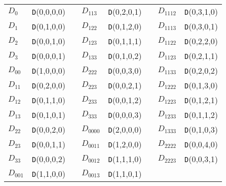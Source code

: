 \documentclass[preprint,sort&compress,12pt]{elsarticle}
\def\arraystretch{1.2}
\begin{document}
\begin{table}
\begin{center}
\renewcommand{\arraystretch}{1.2}
    \begin{tabular}{l|lcl|lcl|l}
$D_0$  & {\tt D}(0,0,0,0)   &\phantom{space}& $D_{113}$ & {\tt D}(0,2,0,1) &\phantom{space}& 
                               $D_{1112}$ & {\tt D}(0,3,1,0) \\  
$D_1$  & {\tt D}(0,1,0,0)   &\phantom{space}& $D_{122}$ & {\tt D}(0,1,2,0) &\phantom{space}& 
                               $D_{1113}$ & {\tt D}(0,3,0,1) \\  
$D_2$  & {\tt D}(0,0,1,0)   &\phantom{space}& $D_{123}$ & {\tt D}(0,1,1,1) &\phantom{space}& 
                               $D_{1122}$ & {\tt D}(0,2,2,0) \\ 
$D_3$  & {\tt D}(0,0,0,1)   &\phantom{space}& $D_{133}$ & {\tt D}(0,1,0,2) &\phantom{space}& 
                               $D_{1123}$ & {\tt D}(0,2,1,1) \\  
$D_{00}$  & {\tt D}(1,0,0,0)   &\phantom{space}& $D_{222}$ & {\tt D}(0,0,3,0) &\phantom{space}& 
                               $D_{1133}$ & {\tt D}(0,2,0,2) \\  
$D_{11}$  & {\tt D}(0,2,0,0)   &\phantom{space}& $D_{223}$ & {\tt D}(0,0,2,1) &\phantom{space}& 
                               $D_{1222}$ & {\tt D}(0,1,3,0) \\  
$D_{12}$  & {\tt D}(0,1,1,0)   &\phantom{space}& $D_{233}$ & {\tt D}(0,0,1,2) &\phantom{space}&
                               $D_{1223}$ & {\tt D}(0,1,2,1) \\ 
$D_{13}$  & {\tt D}(0,1,0,1)   &\phantom{space}& $D_{333}$ & {\tt D}(0,0,0,3) &\phantom{space}&  
                               $D_{1233}$ & {\tt D}(0,1,1,2) \\  
$D_{22}$  & {\tt D}(0,0,2,0)   &\phantom{space}& $D_{0000}$ & {\tt D}(2,0,0,0) &\phantom{space}&
                               $D_{1333}$ & {\tt D}(0,1,0,3) \\  
$D_{23}$  & {\tt D}(0,0,1,1)   &\phantom{space}& $D_{0011}$ & {\tt D}(1,2,0,0) &\phantom{space}&  
                               $D_{2222}$ & {\tt D}(0,0,4,0) \\
$D_{33}$  & {\tt D}(0,0,0,2)   &\phantom{space}& $D_{0012}$ & {\tt D}(1,1,1,0) &\phantom{space}&
                               $D_{2223}$ & {\tt D}(0,0,3,1) \\  
$D_{001}$  & {\tt D}(1,1,0,0)   &\phantom{space}& $D_{0013}$ & {\tt D}(1,1,0,1) &\phantom{space}& 

\end{tabular}
\end{center}
\end{table}
\end{document}
